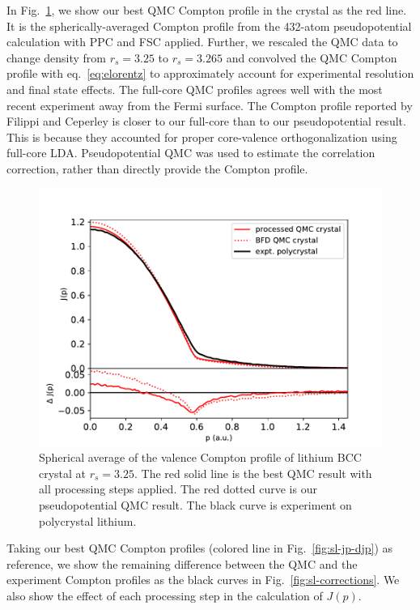 \documentclass[aps,prb,showpacs,preprintnumbers,amsmath,amssymb,superscriptaddress,twocolumn]{revtex4-1}
\begin{document}
In Fig.~\ref{fig:crystal-vcp}, we show our best QMC Compton profile in the crystal as the red line. It is the spherically-averaged Compton profile from the 432-atom pseudopotential calculation with PPC and FSC applied. Further, we rescaled the QMC data to change density from $r_s=3.25$ to $r_s=3.265$ and convolved the QMC Compton profile with eq.~\ref{eq:elorentz} to approximately account for experimental resolution and final state effects. The full-core QMC profiles agrees well with the most recent experiment away from the Fermi surface.
The Compton profile reported by Filippi and Ceperley \cite{Filippi1999} is closer to our full-core than to our pseudopotential result. This is because they accounted for proper core-valence orthogonalization using full-core LDA. Pseudopotential QMC was used to estimate the correlation correction, rather than directly provide the Compton profile.

\begin{figure}
\includegraphics[width=\linewidth]{li62g_crystal-jp}
\caption{Spherical average of the valence Compton profile of lithium BCC crystal at $r_s=3.25$. The red solid line is the best QMC result with all processing steps applied. The red dotted curve is our pseudopotential QMC result. The black curve is experiment on polycrystal lithium. \label{fig:crystal-vcp}}
\end{figure}

Taking our best QMC Compton profiles (colored line in Fig.~\ref{fig:sl-jp-djp}) as reference, we show the remaining difference between the QMC and the experiment Compton profiles as the black curves in Fig.~\ref{fig:sl-corrections}. We also show the effect of each processing step in the calculation of $J(p)$. %
\end{document}
